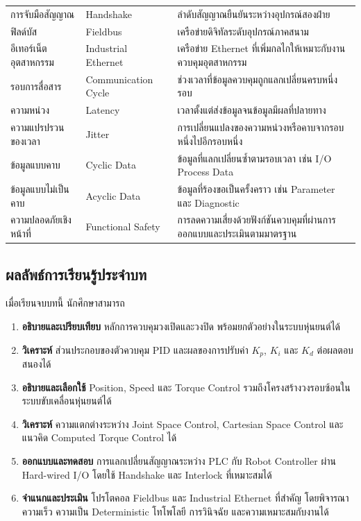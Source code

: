 \begin{table}[htbp]
\begin{tabularx}{\textwidth}{@{}L{0.23\textwidth} L{0.24\textwidth} X@{}}
        การจับมือสัญญาณ & Handshake & ลำดับสัญญาณยืนยันระหว่างอุปกรณ์สองฝ่าย \\
        ฟิลด์บัส & Fieldbus & เครือข่ายดิจิทัลระดับอุปกรณ์ภาคสนาม \\
        อีเทอร์เน็ตอุตสาหกรรม & Industrial Ethernet & เครือข่าย Ethernet ที่เพิ่มกลไกให้เหมาะกับงานควบคุมอุตสาหกรรม \\
        รอบการสื่อสาร & Communication Cycle & ช่วงเวลาที่ข้อมูลควบคุมถูกแลกเปลี่ยนครบหนึ่งรอบ \\
        ความหน่วง & Latency & เวลาตั้งแต่ส่งข้อมูลจนข้อมูลมีผลที่ปลายทาง \\
        ความแปรปรวนของเวลา & Jitter & การเปลี่ยนแปลงของความหน่วงหรือคาบจากรอบหนึ่งไปอีกรอบหนึ่ง \\
        ข้อมูลแบบคาบ & Cyclic Data & ข้อมูลที่แลกเปลี่ยนซ้ำตามรอบเวลา เช่น I/O Process Data \\
        ข้อมูลแบบไม่เป็นคาบ & Acyclic Data & ข้อมูลที่ร้องขอเป็นครั้งคราว เช่น Parameter และ Diagnostic \\
        ความปลอดภัยเชิงหน้าที่ & Functional Safety & การลดความเสี่ยงด้วยฟังก์ชันควบคุมที่ผ่านการออกแบบและประเมินตามมาตรฐาน \\
        \hline
    \end{tabularx}
\end{table}

\subsection{ผลลัพธ์การเรียนรู้ประจำบท}

เมื่อเรียนจบบทนี้ นักศึกษาสามารถ

\begin{enumerate}
    \item \textbf{อธิบายและเปรียบเทียบ} หลักการควบคุมวงเปิดและวงปิด พร้อมยกตัวอย่างในระบบหุ่นยนต์ได้
    \item \textbf{วิเคราะห์} ส่วนประกอบของตัวควบคุม PID และผลของการปรับค่า $K_p$, $K_i$ และ $K_d$ ต่อผลตอบสนองได้
    \item \textbf{อธิบายและเลือกใช้} Position, Speed และ Torque Control รวมถึงโครงสร้างวงรอบซ้อนในระบบขับเคลื่อนหุ่นยนต์ได้
    \item \textbf{วิเคราะห์} ความแตกต่างระหว่าง Joint Space Control, Cartesian Space Control และแนวคิด Computed Torque Control ได้
    \item \textbf{ออกแบบและทดสอบ} การแลกเปลี่ยนสัญญาณระหว่าง PLC กับ Robot Controller ผ่าน Hard-wired I/O โดยใช้ Handshake และ Interlock ที่เหมาะสมได้
    \item \textbf{จำแนกและประเมิน} โปรโตคอล Fieldbus และ Industrial Ethernet ที่สำคัญ โดยพิจารณาความเร็ว ความเป็น Deterministic โทโพโลยี การวินิจฉัย และความเหมาะสมกับงานได้
\end{enumerate}

